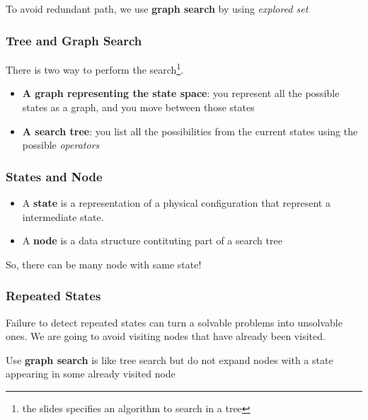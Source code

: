 \subparagraph{ } To avoid redundant path, we use \textbf{graph search}
by using \textit{explored set}

\subsubsection{Tree and Graph Search}

There is two way to  perform the search\footnote{the slides specifies an
algorithm to search in a tree}.

\begin{itemize}

    \item \textbf{A  graph representing the state  space}: you represent
all the possible states as a graph, and you move between those states

    \item \textbf{A  search tree}: you  list all the  possibilities from
the current states using the possible \textit{operators}

\end{itemize}

\subsubsection{States and Node}
\begin{itemize}
    \item A \textbf{state} is a representation of a physical
        configuration that represent a intermediate state.
    \item A \textbf{node} is a data structure contituting part
        of a search tree
\end{itemize}

So, there can be many node with same state!

\subsubsection{Repeated States}

Failure  to detect  repeated states  can turn  a solvable  problems into
unsolvable ones. We are going to  avoid visiting nodes that have already
been visited.

Use \textbf{graph  search} is like tree  search but do not  expand nodes
with a state appearing in some already visited node


